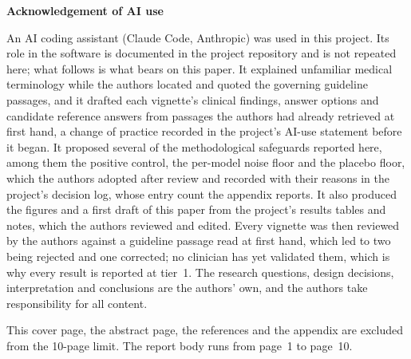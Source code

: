 \documentclass[11pt,twocolumn]{article}
\begin{document}
\begin{titlepage}
\vspace{1.1cm}
\begin{minipage}{0.92\linewidth}
\small
{\centering\bfseries\color{darkred} Acknowledgement of AI use\par}
\vspace{0.25cm}
\noindent
An AI coding assistant (Claude Code, Anthropic) was used in this project.
Its role in the software is documented in the project repository and is not
repeated here; what follows is what bears on this paper. It explained unfamiliar
medical terminology while the authors located and quoted the governing guideline
passages, and it drafted each vignette's clinical findings, answer options and
candidate reference answers from passages the authors had already retrieved at
first hand, a change of practice recorded in the project's AI-use statement
before it began.
It proposed several of the methodological safeguards reported here, among them
the positive control, the per-model noise floor and the placebo floor, which the
authors adopted after review and recorded with their reasons in the project's
decision log, whose entry count the appendix reports. It also produced the figures and a first
draft of this paper from the project's results tables and notes, which the
authors reviewed and edited. Every vignette was then reviewed by the authors
against a guideline passage read at first hand, which led to two being rejected
and one corrected; no clinician has yet validated them, which is why every result
is reported at tier~1. The research questions, design decisions, interpretation
and conclusions are the authors' own, and the authors take responsibility for all
content.
\end{minipage}

\vfill
{\footnotesize This cover page, the abstract page, the references and the appendix
are excluded from the 10-page limit. The report body runs from page~1 to page~10.\par}
\end{titlepage}

\onecolumn
{}
\end{document}
